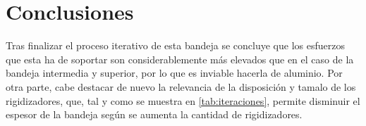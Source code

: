 \newpage
\section{Conclusiones}

Tras finalizar el proceso iterativo de esta bandeja se concluye que los esfuerzos que esta ha de soportar son considerablemente más elevados que en el caso de la bandeja intermedia y superior, por lo que es inviable hacerla de aluminio. Por otra parte, cabe destacar de nuevo la relevancia de la disposición y tamalo de los rigidizadores, que, tal y como se muestra en \autoref{tab:iteraciones}, permite disminuir el espesor de la bandeja según se aumenta la cantidad de rigidizadores. 